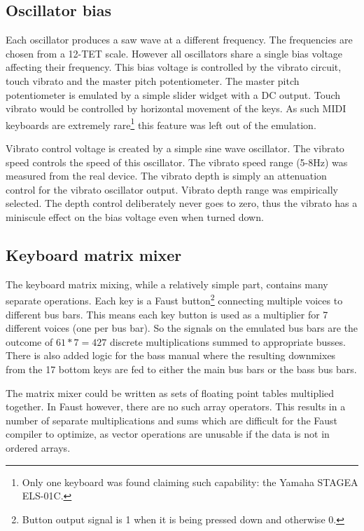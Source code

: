\documentclass[11pt,a4paper]{article}
\begin{document}
\subsection{Oscillator bias}
\label{section:oscillator-bias}

Each oscillator produces a saw wave at a different frequency. The frequencies are chosen from a 12-TET scale. However all oscillators share a single bias voltage affecting their frequency. This bias voltage is controlled by the vibrato circuit, touch vibrato and the master pitch potentiometer. The master pitch potentiometer is emulated by a simple slider widget with a DC output. Touch vibrato would be controlled by horizontal movement of the keys. As such MIDI keyboards are extremely rare\footnote{Only one keyboard was found claiming such capability: the Yamaha STAGEA ELS-01C.} this feature was left out of the emulation.

Vibrato control voltage is created by a simple sine wave oscillator. The vibrato speed controls the speed of this oscillator. The vibrato speed range (5-8Hz) was measured from the real device. The vibrato depth is simply an attenuation control for the vibrato oscillator output. Vibrato depth range was empirically selected. The depth control deliberately never goes to zero, thus the vibrato has a miniscule effect on the bias voltage even when turned down.

\subsection{Keyboard matrix mixer}

The keyboard matrix mixing, while a relatively simple part, contains many separate operations. Each key is a Faust button\footnote{Button output signal is 1 when it is being pressed down and otherwise 0.} connecting multiple voices to different bus bars. This means each key button is used as a multiplier for 7 different voices (one per bus bar). So the signals on the emulated bus bars are the outcome of $61*7 = 427$ discrete multiplications summed to appropriate busses. There is also added logic for the bass manual where the resulting downmixes from the 17 bottom keys are fed to either the main bus bars or the bass bus bars.

The matrix mixer could be written as sets of floating point tables multiplied together. In Faust however, there are no such array operators. This results in a number of separate multiplications and sums which are difficult for the Faust compiler to optimize, as vector operations are unusable if the data is not in ordered arrays.
\end{document}
